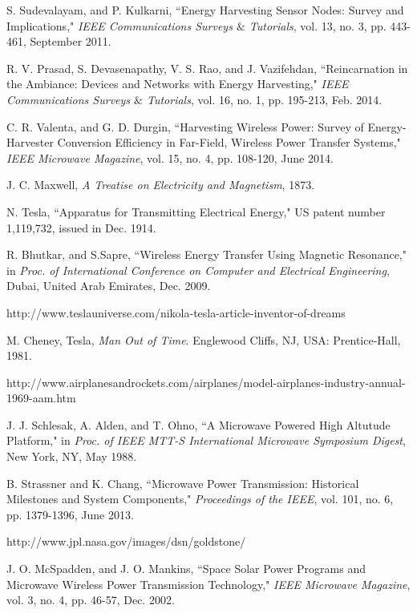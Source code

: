 \documentclass[twocolumn,10pt]{IEEEtran}
\begin{document}
\begin{thebibliography}{99}
S. Sudevalayam, and P. Kulkarni, ``Energy Harvesting Sensor Nodes: Survey and Implications,"
\emph{IEEE Communications Surveys $\&$ Tutorials}, vol. 13, no. 3, pp.  443-461, September  2011.

R. V. Prasad, S. Devasenapathy, V. S. Rao, and J. Vazifehdan,  ``Reincarnation in the Ambiance: Devices and Networks with Energy Harvesting," \emph{IEEE Communications Surveys $\&$ Tutorials}, vol. 16, no. 1, pp. 195-213, Feb. 2014.

C. R. Valenta, and G. D. Durgin, ``Harvesting Wireless Power: Survey of Energy-Harvester Conversion Efficiency in Far-Field, Wireless Power Transfer Systems," \emph{IEEE Microwave Magazine}, vol. 15, no. 4, pp. 108-120, June 2014.

J. C. Maxwell, \emph{A Treatise on Electricity and Magnetism}, 1873.

N. Tesla, ``Apparatus for Transmitting Electrical Energy," US patent number 1,119,732, issued in Dec. 1914.

R. Bhutkar, and S.Sapre, ``Wireless Energy Transfer Using Magnetic Resonance," in \emph{Proc. of International Conference on Computer and Electrical Engineering}, Dubai, United Arab Emirates, Dec. 2009. 

http://www.teslauniverse.com/nikola-tesla-article-inventor-of-dreams

M. Cheney, Tesla, {\em Man Out of Time}. Englewood Cliffs, NJ, USA: Prentice-Hall, 1981.

http://www.airplanesandrockets.com/airplanes/model-airplanes-industry-annual-1969-aam.htm


J. J. Schlesak, A. Alden, and  T. Ohno, ``A Microwave Powered High Altutude Platform," in \emph{Proc. of IEEE MTT-S International Microwave Symposium Digest}, New York, NY, May 1988.  

B. Strassner and K. Chang, ``Microwave Power Transmission: Historical Milestones and System Components,"
\emph{Proceedings of the IEEE}, vol. 101, no. 6, pp. 1379-1396, June  2013.

http://www.jpl.nasa.gov/images/dsn/goldstone/


J. O. McSpadden, and J. O. Mankins, 
``Space Solar Power Programs and Microwave Wireless Power Transmission Technology," \emph{IEEE Microwave Magazine}, vol. 3, no. 4, pp. 46-57, Dec. 2002.


\end{thebibliography}
\end{document}
